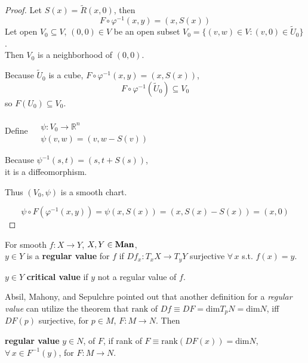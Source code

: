 \begin{proof}
	Let $S(x) = \widetilde{R}(x,0)$, then
	\[
	F \circ \varphi^{-1}(x,y) = (x, S(x))
	\]
	Let open $V_0 \subseteq V$, $(0,0) \in V$ be an open subset $V_0 = \lbrace (v,w) \in V: (v,0) \in \widetilde{U}_0 \rbrace$. \\
	Then $V_0 $ is a neighborhood of $(0,0)$.
	
	Because $\widetilde{U}_0$ is a cube, $F \circ \varphi^{-1}(x,y) = (x, S(x))$,
	\[
	F\circ \varphi^{-1}(\widetilde{U}_0) \subseteq V_0
	\]
	so $F(U_0) \subseteq V_0$.
	
	Define $\begin{aligned} & \quad \\ 
	& \psi : V_0 \to \mathbb{R}^n \\
	& \psi (v,w) = (v, w- S(v)) \end{aligned}$
	
	Because $\psi^{-1}(s,t) = (s, t+S(s))$, \\
	it is a diffeomorphism.
	
	Thus $(V_0, \psi)$ is a smooth chart. 
	
	\[
	\psi \circ F (\varphi^{-1}(x,y)) = \psi(x, S(x)) = (x, S(x) - S(x)) = (x, 0)
	\]
	

	\end{proof}


\begin{definition}
	For smooth $f:X\to Y$, $X,Y \in \text{\textbf{Man}}$, \\
	$y\in Y$ is a \textbf{regular value} for $f$ if $Df_x:T_xX \to T_y Y$ surjective $\forall \, x$ s.t. $f(x)=y$.  
	
	$y\in Y$ \textbf{critical value} if $y$ not a regular value of $f$.  
\end{definition}

Absil, Mahony, and Sepulchre \cite{dgdt:AMS2008} pointed out that another definition for a \emph{regular value} can utilize the theorem that $\text{rank}$ of $Df \equiv DF = \text{dim} T_pN = \text{dim} N$, iff $DF(p)$ surjective, for $p\in M$, $F:M\to N$.  Then 

\textbf{regular value} $y \in N$, of $F$, if rank of $F \equiv \text{rank}(DF(x)) = \text{dim}N$, $\forall \, x \in F^{-1}(y)$, for $F:M\to N$.  


